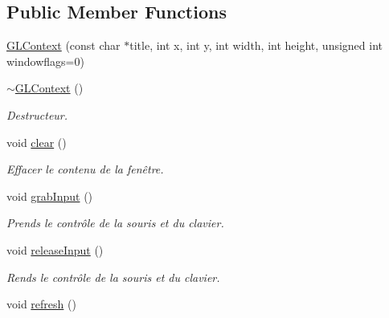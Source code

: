 \subsection*{Public Member Functions}
\begin{DoxyCompactItemize}
\item 
\hyperlink{class_g_l_context_a7fcab81e563e8dd533a1950b1aa45067}{G\+L\+Context} (const char $\ast$title, int x, int y, int width, int height, unsigned int windowflags=0)
\item 
\hypertarget{class_g_l_context_aae8b3e070f7f2a9ecf235202f2e330dd}{}\hyperlink{class_g_l_context_aae8b3e070f7f2a9ecf235202f2e330dd}{$\sim$\+G\+L\+Context} ()\label{class_g_l_context_aae8b3e070f7f2a9ecf235202f2e330dd}

\begin{DoxyCompactList}\small\item\em Destructeur. \end{DoxyCompactList}\item 
\hypertarget{class_g_l_context_a224adc913631ac7762e762264a7a41f5}{}void \hyperlink{class_g_l_context_a224adc913631ac7762e762264a7a41f5}{clear} ()\label{class_g_l_context_a224adc913631ac7762e762264a7a41f5}

\begin{DoxyCompactList}\small\item\em Effacer le contenu de la fenêtre. \end{DoxyCompactList}\item 
\hypertarget{class_g_l_context_a1e4e8d544e8e6f57d5d54e24c1e943a5}{}void \hyperlink{class_g_l_context_a1e4e8d544e8e6f57d5d54e24c1e943a5}{grab\+Input} ()\label{class_g_l_context_a1e4e8d544e8e6f57d5d54e24c1e943a5}

\begin{DoxyCompactList}\small\item\em Prends le contrôle de la souris et du clavier. \end{DoxyCompactList}\item 
\hypertarget{class_g_l_context_a76d1db346b8303fb60eaf0753daa2c1f}{}void \hyperlink{class_g_l_context_a76d1db346b8303fb60eaf0753daa2c1f}{release\+Input} ()\label{class_g_l_context_a76d1db346b8303fb60eaf0753daa2c1f}

\begin{DoxyCompactList}\small\item\em Rends le contrôle de la souris et du clavier. \end{DoxyCompactList}\item 
\hypertarget{class_g_l_context_a0c0b3a51e6326cbd66acbdd573d5c8bd}{}void \hyperlink{class_g_l_context_a0c0b3a51e6326cbd66acbdd573d5c8bd}{refresh} ()\label{class_g_l_context_a0c0b3a51e6326cbd66acbdd573d5c8bd}


\end{DoxyCompactItemize}
